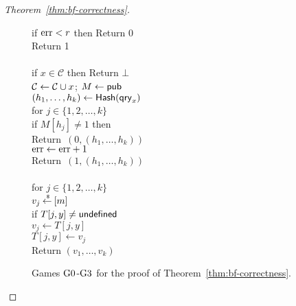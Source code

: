 \begin{proof}[Theorem~\ref{thm:bf-correctness}]
\begin{figure}[tp]
{{if $\mathrm{err}  < r$ then Return 0\\
Return 1\\ 
%
\\
if $x \in \mathcal{C}$ then Return $\bot$\\
${\cal C} \gets {\cal C} \cup x$; $M \gets{\sf pub}$\\
$(h_1, \ldots, h_{k}) \gets \mathsf{Hash}(\mathsf{qry}_x)$\\
for $j \in \{1,2,\ldots,k\}$\\
\nudge if $M[h_j] \neq 1$ then \\
\nudge \nudge Return~$(0, (h_1, \ldots, h_{k}) )$\\
$\mathrm{err} \gets \mathrm{err} +1$\\
Return~$(1, (h_1, \ldots, h_{k}) )$\\
%
\\
for $j \in \{1,2,\ldots,k\}$\\
\nudge $v_j {\:\stackrel{{\scriptscriptstyle \hspace{0.2em}\$}} {\leftarrow}\:} [m]$\\
\nudge if $T[j,y] \neq \mathsf{undefined}$\\
\nudge \nudge $v_j \gets T[j,y]$\\
\nudge $T[j,y] \gets v_j$\\
Return $\left(v_1,\ldots,v_k\right)$
}
}
\caption{Games $\text{G0}$-$\text{G3}$ for the
proof of Theorem~\ref{thm:bf-correctness}.}
\label{fig:bf-correctness-games1}
\end{figure}
\begin{figure}[tp]
\end{figure}
\end{proof}
